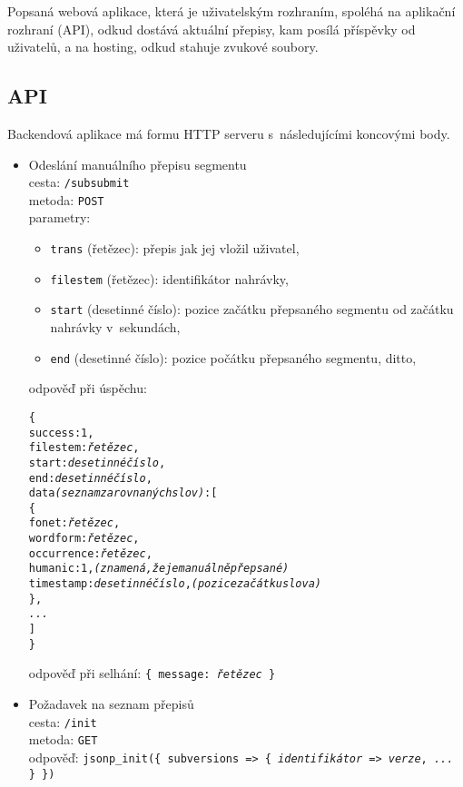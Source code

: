 Popsaná webová aplikace, která je uživatelským rozhraním, spoléhá na aplikační
rozhraní (API), odkud dostává aktuální přepisy, kam posílá příspěvky od
uživatelů, a na hosting, odkud stahuje zvukové soubory.

\subsection{API}

Backendová aplikace má formu HTTP serveru s~následujícími koncovými body.

\begin{itemize}
\item{
    Odeslání manuálního přepisu segmentu \\
    cesta: \texttt{/subsubmit} \\
    metoda: \texttt{POST} \\
    parametry:
    \begin{itemize}
        \item{\texttt{trans} (řetězec): přepis jak jej vložil uživatel,}
        \item{\texttt{filestem} (řetězec): identifikátor nahrávky,}
        \item{\texttt{start} (desetinné číslo): pozice začátku přepsaného segmentu od začátku nahrávky v~sekundách,}
        \item{\texttt{end} (desetinné číslo): pozice počátku přepsaného segmentu, ditto,}
    \end{itemize}
    odpověď při úspěchu: \begin{alltt}\{
        success: 1,
        filestem: {\em řetězec},
        start: {\em desetinné číslo},
        end: {\em desetinné číslo},
        data {\em (seznam zarovnaných slov)}: [ 
            \{
                fonet: {\em řetězec},
                wordform: {\em řetězec},
                occurrence: {\em řetězec},
                humanic: 1, {\em (znamená, že je manuálně přepsané)}
                timestamp: {\em desetinné číslo}, {\em (pozice začátku slova)}
            \},
            {\em ...}
        ]
    \}\end{alltt}
    odpověď při selhání: \texttt{\{ message: {\em řetězec} \}}
}
\item{
    Požadavek na seznam přepisů \\
    cesta: \texttt{/init} \\
    metoda: \texttt{GET} \\
    odpověď: \texttt{jsonp\_init(\{ subversions => \{ {\em identifikátor} => {\em verze}, {\em ...} \} \})} \\

}
\end{itemize}
